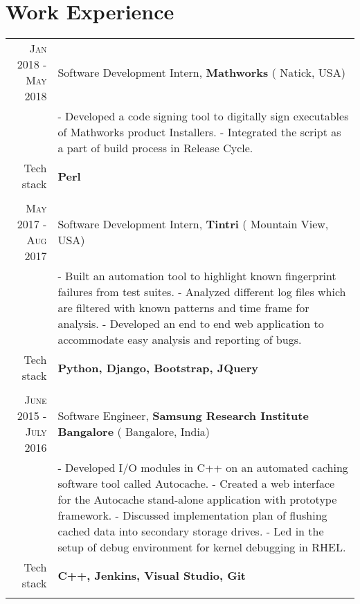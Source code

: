\section {Work Experience}
\renewcommand{\arraystretch}{0.95}%
\begin{tabular}{r|p{14cm}}

\textsc {Jan 2018 - May 2018} & Software Development Intern, \textbf{Mathworks} ( Natick, USA)\\
& \small{
- Developed a code signing tool to digitally sign executables of Mathworks product Installers. \newline
- Integrated the script as a part of build process in Release Cycle.} \\
\small{Tech stack} &\footnotesize{\textbf{Perl}} \\
\multicolumn{2}{c}{} \\

\textsc {May 2017 - Aug 2017} & Software Development Intern, \textbf{Tintri} ( Mountain View, USA)\\
& \small{
- Built an automation tool to highlight known fingerprint failures from test suites. \newline
- Analyzed different log files which are filtered with known patterns and time frame for analysis.\newline
- Developed an end to end web application to accommodate easy analysis and reporting of bugs.} \\
\small{Tech stack} &\footnotesize{\textbf{Python, Django, Bootstrap, JQuery}} \\
\multicolumn{2}{c}{} \\

\textsc {June 2015 - July 2016} & Software Engineer, \textbf{Samsung Research Institute Bangalore} ( Bangalore, India) \\
& \small{
- Developed I/O modules in C++ on an automated caching software tool called Autocache.\newline
- Created a web interface for the Autocache stand-alone application with prototype framework.\newline
- Discussed implementation plan of flushing cached data into secondary storage drives.\newline
- Led in the setup of debug environment for kernel debugging in RHEL.}\\
\small{Tech stack} &\footnotesize{\textbf{C++, Jenkins, Visual Studio, Git}} \\
\multicolumn{2}{c}{} \\



\end{tabular}
